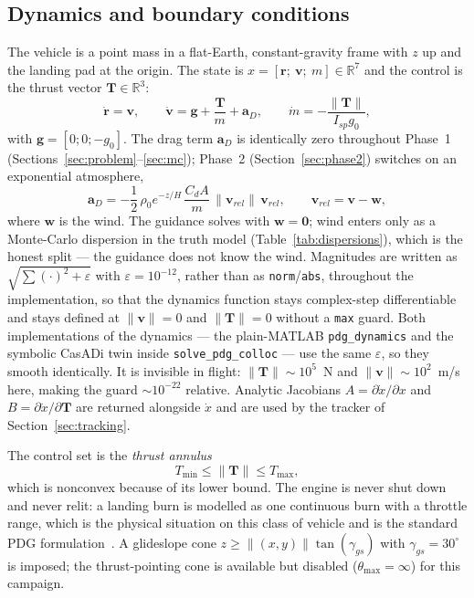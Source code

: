 \documentclass[11pt]{article}
\newcommand{\rvec}{\mathbf{r}}
\newcommand{\vvec}{\mathbf{v}}
\newcommand{\Tvec}{\mathbf{T}}
\newcommand{\gvec}{\mathbf{g}}
\newcommand{\Tmin}{T_{\min}}
\newcommand{\Tmax}{T_{\max}}
\begin{document}
\subsection{Dynamics and boundary conditions}

The vehicle is a point mass in a flat-Earth, constant-gravity frame with $z$
up and the landing pad at the origin. The state is
$x = [\rvec;\ \vvec;\ m] \in \mathbb{R}^7$ and the control is the thrust
vector $\Tvec \in \mathbb{R}^3$:
%
\begin{equation}
\dot{\rvec} = \vvec, \qquad
\dot{\vvec} = \gvec + \frac{\Tvec}{m} + \mathbf{a}_D, \qquad
\dot{m} = -\frac{\lVert \Tvec \rVert}{I_{sp} g_0},
\label{eq:dyn}
\end{equation}
%
with $\gvec = [0;0;-g_0]$. The drag term $\mathbf{a}_D$ is identically zero
throughout Phase~1 (Sections~\ref{sec:problem}--\ref{sec:mc}); Phase~2
(Section~\ref{sec:phase2}) switches on an exponential atmosphere,
%
\begin{equation}
\mathbf{a}_D = -\frac{1}{2}\,\rho_0 e^{-z/H}\, \frac{C_d A}{m}\,
\lVert \vvec_{rel} \rVert\, \vvec_{rel},
\qquad \vvec_{rel} = \vvec - \mathbf{w},
\label{eq:drag}
\end{equation}
%
where $\mathbf{w}$ is the wind. The guidance solves with $\mathbf{w} =
\mathbf{0}$; wind enters only as a Monte-Carlo dispersion in the truth
model (Table~\ref{tab:dispersions}), which is the honest split --- the
guidance does not know the wind.
%
Magnitudes are written as $\sqrt{\sum(\cdot)^2 + \varepsilon}$ with
$\varepsilon = 10^{-12}$, rather than as \texttt{norm}/\texttt{abs},
throughout the implementation, so that the dynamics function stays
complex-step differentiable and stays defined at $\lVert\vvec\rVert = 0$
and $\lVert\Tvec\rVert = 0$ without a \texttt{max} guard. Both
implementations of the dynamics --- the plain-MATLAB
\texttt{pdg\_dynamics} and the symbolic CasADi twin inside
\texttt{solve\_pdg\_colloc} --- use the same $\varepsilon$, so they smooth
identically. It is invisible in flight: $\lVert\Tvec\rVert \sim 10^5$~N and
$\lVert\vvec\rVert \sim 10^2$~m/s here, making the guard $\sim10^{-22}$
relative. Analytic Jacobians
$A = \partial \dot{x}/\partial x$ and $B = \partial \dot{x} / \partial
\Tvec$ are returned alongside $\dot x$ and are used by the tracker of
Section~\ref{sec:tracking}.

The control set is the \emph{thrust annulus}
%
\begin{equation}
\Tmin \le \lVert \Tvec \rVert \le \Tmax ,
\label{eq:annulus}
\end{equation}
%
which is nonconvex because of its lower bound. The engine is never shut
down and never relit: a landing burn is modelled as one continuous burn
with a throttle range, which is the physical situation on this class of
vehicle and is the standard PDG formulation~\cite{acikmese2007}. A
glideslope cone $z \ge \lVert (x,y) \rVert \tan(\gamma_{gs})$ with
$\gamma_{gs} = 30^\circ$ is imposed; the thrust-pointing cone is available
but disabled ($\theta_{\max} = \infty$) for this campaign.
\end{document}
